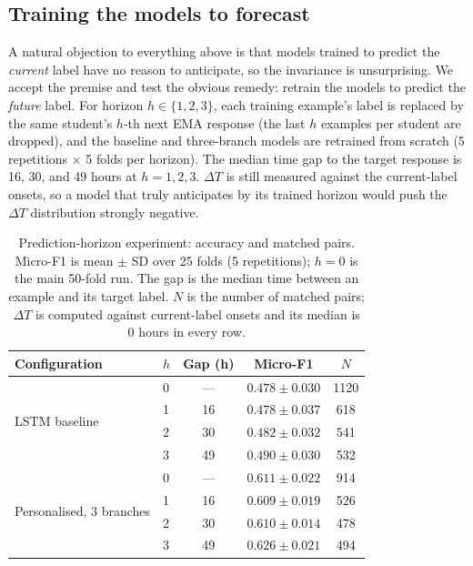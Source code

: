 \documentclass[preprint,12pt,authoryear]{elsarticle}
\newcommand{\dt}{$\Delta T$}
\begin{document}
\subsection{Training the models to forecast}
\label{sec:horizon}

A natural objection to everything above is that models trained to
predict the \emph{current} label have no reason to anticipate, so the
invariance is unsurprising. We accept the premise and test the obvious
remedy: retrain the models to predict the \emph{future} label. For
horizon $h \in \{1, 2, 3\}$, each training example's label is replaced
by the same student's $h$-th next EMA response (the last $h$ examples
per student are dropped), and the baseline and three-branch models are
retrained from scratch (5 repetitions $\times$ 5 folds per horizon).
The median time gap to the target response is 16, 30, and 49 hours at
$h = 1, 2, 3$. \dt{} is still measured against the current-label
onsets, so a model that truly anticipates by its trained horizon would
push the \dt{} distribution strongly negative.

\begin{table}[h]
\centering
\caption{Prediction-horizon experiment: accuracy and matched pairs.
Micro-F1 is mean $\pm$ SD over 25 folds (5 repetitions); $h = 0$ is the
main 50-fold run. The gap is the median time between an example and its
target label. $N$ is the number of matched pairs; \dt{} is computed
against current-label onsets and its median is 0 hours in every row.}
\label{tab:horizon}
\begin{tabular}{llccc}
\toprule
Configuration & $h$ & Gap (h) & Micro-F1 & $N$ \\
\midrule
\multirow{4}{*}{LSTM baseline}
 & 0 & ---  & $0.478 \pm 0.030$ & 1120 \\
 & 1 & 16   & $0.478 \pm 0.037$ & 618  \\
 & 2 & 30   & $0.482 \pm 0.032$ & 541  \\
 & 3 & 49   & $0.490 \pm 0.030$ & 532  \\
\midrule
\multirow{4}{*}{Personalised, 3 branches}
 & 0 & ---  & $0.611 \pm 0.022$ & 914  \\
 & 1 & 16   & $0.609 \pm 0.019$ & 526  \\
 & 2 & 30   & $0.610 \pm 0.014$ & 478  \\
 & 3 & 49   & $0.626 \pm 0.021$ & 494  \\
\bottomrule
\end{tabular}
\end{table}
\end{document}
